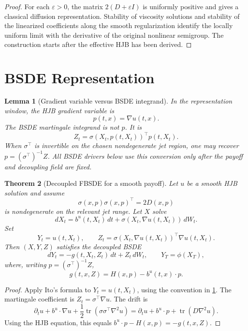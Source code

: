 \documentclass[11pt]{amsart}
\newtheorem{theorem}{Theorem}[section]
\newtheorem{lemma}[theorem]{Lemma}
\theoremstyle{definition}
\theoremstyle{remark}
\newcommand{\Tr}{\operatorname{tr}}
\begin{document}
\begin{proof}
For each $\varepsilon>0$, the matrix $2(D+\varepsilon I)$ is uniformly positive
and gives a classical diffusion representation.  Stability of viscosity
solutions \cite{CrandallIshiiLions1992,FlemingSoner2006} and stability of the
linearized coefficients along the smooth regularization identify the locally
uniform limit with the derivative of the original nonlinear semigroup.  The
construction starts after the effective HJB has been derived.
\end{proof}

\section{BSDE Representation}

\begin{lemma}[Gradient variable versus BSDE integrand]
\label{lem:gradient_z_conversion}
In the representation window, the HJB gradient variable is
\[
  p(t,x)=\nabla u(t,x).
\]
The BSDE martingale integrand is not \(p\).  It is
\[
  Z_t=\sigma(X_t,p(t,X_t))^\top p(t,X_t).
\]
When \(\sigma^\top\) is invertible on the chosen nondegenerate jet region, one
may recover \(p=(\sigma^\top)^{-1}Z\).  All BSDE drivers below use this
conversion only after the payoff and decoupling field are fixed.
\end{lemma}

\begin{theorem}[Decoupled FBSDE for a smooth payoff]
\label{thm:fbsde_representation}
Let $u$ be a smooth HJB solution and assume
\[
  \sigma(x,p)\sigma(x,p)^\top=2D(x,p)
\]
is nondegenerate on the relevant jet range.  Let $X$ solve
\begin{equation}
  dX_t=b^u(t,X_t)\,dt+\sigma(X_t,\nabla u(t,X_t))\,dW_t .
\end{equation}
Set
\[
  Y_t=u(t,X_t),\qquad
  Z_t=\sigma(X_t,\nabla u(t,X_t))^\top\nabla u(t,X_t).
\]
Then $(X,Y,Z)$ satisfies the decoupled BSDE
\begin{equation}
  dY_t=-g(t,X_t,Z_t)\,dt+Z_t\,dW_t,
  \qquad Y_T=\phi(X_T),
\end{equation}
where, writing $p=(\sigma^\top)^{-1}Z$,
\begin{equation}
  g(t,x,Z)=H(x,p)-b^u(t,x)\cdot p .
\end{equation}
\end{theorem}

\begin{proof}
Apply Ito's formula to $Y_t=u(t,X_t)$, using the convention in
\cref{lem:gradient_z_conversion}.  The martingale coefficient is
$Z_t=\sigma^\top\nabla u$.  The drift is
\[
  \partial_tu+b^u\cdot\nabla u+\frac12\Tr(\sigma\sigma^\top\nabla^2u)
  =\partial_tu+b^u\cdot p+\Tr(D\nabla^2u).
\]
Using the HJB equation, this equals $b^u\cdot p-H(x,p)=-g(t,x,Z)$.
\end{proof}
\end{document}
